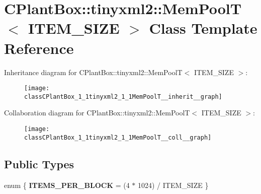 \hypertarget{classCPlantBox_1_1tinyxml2_1_1MemPoolT}{}\section{C\+Plant\+Box\+:\+:tinyxml2\+:\+:Mem\+PoolT$<$ I\+T\+E\+M\+\_\+\+S\+I\+ZE $>$ Class Template Reference}
\label{classCPlantBox_1_1tinyxml2_1_1MemPoolT}


Inheritance diagram for C\+Plant\+Box\+:\+:tinyxml2\+:\+:Mem\+PoolT$<$ I\+T\+E\+M\+\_\+\+S\+I\+ZE $>$\+:\nopagebreak
\begin{figure}[H]
\begin{center}
\leavevmode
\texttt{[image: classCPlantBox\_1\_1tinyxml2\_1\_1MemPoolT\_\_inherit\_\_graph]}
\end{center}
\end{figure}


Collaboration diagram for C\+Plant\+Box\+:\+:tinyxml2\+:\+:Mem\+PoolT$<$ I\+T\+E\+M\+\_\+\+S\+I\+ZE $>$\+:\nopagebreak
\begin{figure}[H]
\begin{center}
\leavevmode
\texttt{[image: classCPlantBox\_1\_1tinyxml2\_1\_1MemPoolT\_\_coll\_\_graph]}
\end{center}
\end{figure}
\subsection*{Public Types}
\begin{DoxyCompactItemize}
\item 
\mbox{\label{classCPlantBox_1_1tinyxml2_1_1MemPoolT_ab57c95e6a7d77bf635b3f71ce8cfa758}} 
enum \{ {\bfseries I\+T\+E\+M\+S\+\_\+\+P\+E\+R\+\_\+\+B\+L\+O\+CK} = (4 $\ast$ 1024) / I\+T\+E\+M\+\_\+\+S\+I\+ZE
 \}
\end{DoxyCompactItemize}
